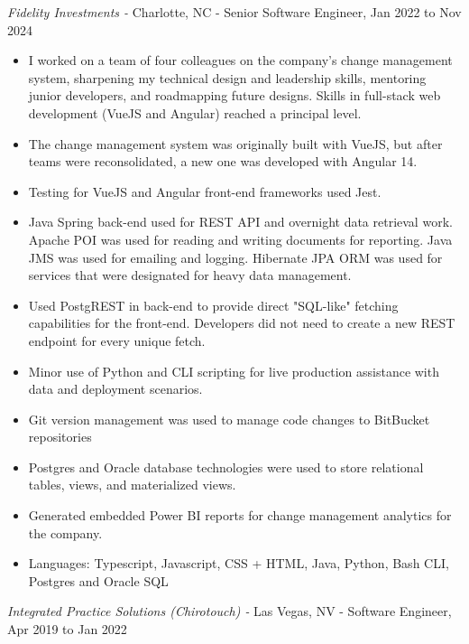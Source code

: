 \documentclass[a4paper,10pt]{article}
\begin{document}
    {\sl Fidelity Investments -}{ Charlotte, NC - Senior Software Engineer, Jan 2022 to Nov 2024}
        \begin{itemize}
            \item I worked on a team of four colleagues on the company's change management system, sharpening my technical design and leadership skills, mentoring junior developers, and roadmapping future designs. Skills in full-stack web development (VueJS and Angular) reached a principal level.
            \item The change management system was originally built with VueJS, but after teams were reconsolidated, a new one was developed with Angular 14.
            \item Testing for VueJS and Angular front-end frameworks used Jest.
            \item Java Spring back-end used for REST API and overnight data retrieval work. Apache POI was used for reading and writing documents for reporting. Java JMS was used for emailing and logging. Hibernate JPA ORM was used for services that were designated for heavy data management.
            \item Used PostgREST in back-end to provide direct "SQL-like" fetching capabilities for the front-end. Developers did not need to create a new REST endpoint for every unique fetch.
            \item Minor use of Python and CLI scripting for live production assistance with data and deployment scenarios.
            \item Git version management was used to manage code changes to BitBucket repositories
            \item Postgres and Oracle database technologies were used to store relational tables, views, and materialized views.
            \item Generated embedded Power BI reports for change management analytics for the company.
            \item Languages: Typescript, Javascript, CSS + HTML, Java, Python, Bash CLI, Postgres and Oracle SQL
        \end{itemize}
    {\sl Integrated Practice Solutions (Chirotouch) -}{ Las Vegas, NV - Software Engineer, Apr 2019 to Jan 2022}
\end{document}
